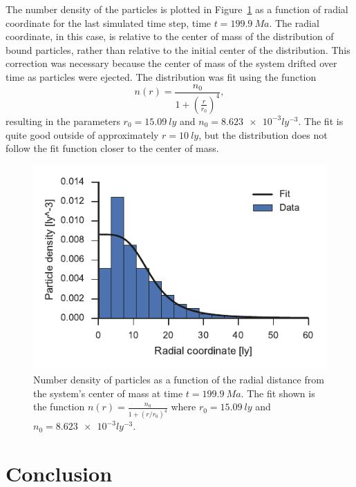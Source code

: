 \documentclass[aps,prc,reprint,floatfix,nobalancelastpage]{revtex4-1}
\begin{document}
    The number density of the particles is plotted in Figure~\ref{fig:dens} as a function of radial coordinate for the last simulated time step, time $t = \SI{199.9}{Ma}$. The radial coordinate, in this case, is relative to the center of mass of the distribution of bound particles, rather than relative to the initial center of the distribution. This correction was necessary because the center of mass of the system drifted over time as particles were ejected. The distribution was fit using the function
    \begin{equation}
        n(r) = \frac{n_0}{1 + \left(\frac{r}{r_0}\right)^4},
    \end{equation}
    resulting in the parameters $r_0 = \SI{15.09}{ly}$ and $n_0 = \num{8.623e-3}{ly^{-3}}$. The fit is quite good outside of approximately $r = \SI{10}{ly}$, but the distribution does not follow the fit function closer to the center of mass.

    \begin{figure}[p]
        \centering
        \includegraphics{dens.pdf}
        \caption{Number density of particles as a function of the radial distance from the system's center of mass at time $t=\SI{199.9}{Ma}$. The fit shown is the function $n(r) = \frac{n_0}{1 + (r / r_0)^4}$ where $r_0 = \SI{15.09}{ly}$ and $n_0 = \num{8.623e-3}{ly^{-3}}$.}
        \label{fig:dens}
    \end{figure}

\section{Conclusion}
\label{sec:conclusion}
\end{document}
